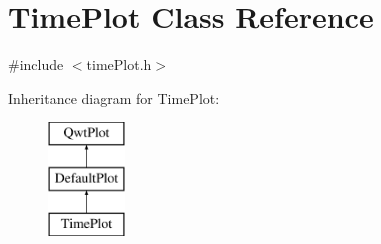 \hypertarget{class_time_plot}{\section{Time\+Plot Class Reference}
\label{class_time_plot}
}


{\ttfamily \#include $<$time\+Plot.\+h$>$}

Inheritance diagram for Time\+Plot\+:\begin{figure}[H]
\begin{center}
\leavevmode
\includegraphics[height=3.000000cm]{class_time_plot}
\end{center}
\end{figure}
